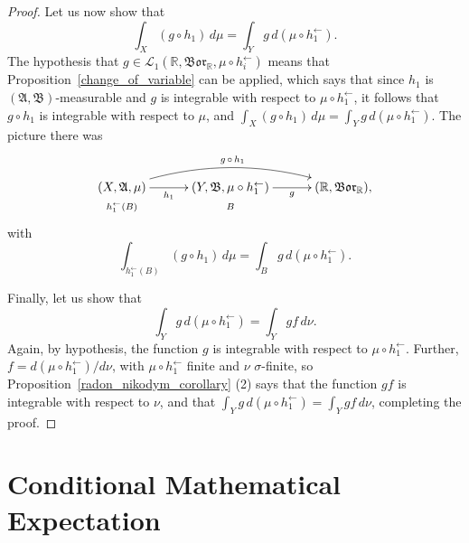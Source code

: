 \documentclass[
twoside=true,
paper=letter,
fontsize=11pt,
pagesize=auto,
leqno,
openany,
headsepline,
overfullrule,
]{scrbook}
\theoremstyle{plain}
\theoremstyle{plain}
\theoremstyle{definition}
\theoremstyle{bfnoteitalic}
\theoremstyle{bfnoteroman}
\newcommand{\sigalg}[1]{\mathfrak{#1}}
\newcommand{\cali}[1]{\mathscr{#1}}
\newcommand{\borel}{\mathfrak{Bor}}
\newcommand{\textsigma}{\hbox{\large{$\sigma$}}\kern-1pt}
\newcommand{\preimage}[1]{#1^{\leftarrow}}
\newcommand{\R}{\mathbb{R}}
\newcommand{\sigmaalgebra}{\sigalg{A}}
\newcommand{\sigmaalgebraii}{\sigalg{B}}
\newcommand{\funcf}{f}
\newcommand{\funcg}{g}
\newcommand{\funch}{h}
\newcommand{\functionii}{g}
\newcommand{\functioniii}{h}
\newcommand{\measurespace}{X}
\newcommand{\measurespaceii}{Y}
\newcommand{\measure}{\mu}
\newcommand{\measmu}{\mu}
\newcommand{\measnu}{\nu}
\newcommand{\setii}{B}
\begin{document}
\begin{proof}
Let us now show that
\[
\int_\measurespace (\funcg \circ \funch_1) \,d\measure
=
\int_\measurespaceii \funcg \, d(\measmu\circ \preimage{\funch_1}) .
\]
The hypothesis that
$\functionii \in\cali{L}_1(\R, \borel_\R,\measure\circ\preimage{\functioniii_i})$
means that Proposition~\ref{change_of_variable}  can be applied, which says that since 
$\funch_1$ is 
$(\sigmaalgebra,\sigmaalgebraii)$\hyp{}measurable and
$\funcg$ is integrable with respect to 
$\measmu \circ \preimage{\funch_1}$, it follows that 
$\funcg \circ \funch_1$ 
is integrable with respect to $\measmu$, and
$\int_\measurespace (\funcg\circ\funch_1)\,d\mu
=
\int_\measurespaceii \funcg \, d(\measmu\circ \preimage{\funch_1})$. The picture there was
\[
\xymatrix@R=0pt@C=30pt{ 
(\measurespace,\sigmaalgebra,\measure)
\ar[r]_-{\funch_1} \ar@/^16pt/[rr]^{\funcg\, \circ\, \funch_1}
& (\measurespaceii,\sigmaalgebraii,\measmu\circ \preimage{\funch_1}) 
\ar[r]_-{\funcg}
& (\R,\borel_\R), \\
\scriptstyle{\preimage{\funch_1}(\setii)} & \scriptstyle{\setii} & \\
}
\]
with
\[
\int_{\preimage{\funch_1}(\setii)} (\funcg \circ \funch_1) \, d\measure
= \int_\setii \funcg \, d(\measmu\circ \preimage{\funch_1}).
\]

Finally, let us show that 
\[
\int_\measurespaceii \funcg \, d(\measmu\circ \preimage{\funch_1})
=
\int_\measurespaceii \funcg \funcf \, d\measnu.
\]
Again, by hypothesis, the function $\funcg$ is integrable with respect to 
$\measmu\circ \preimage{\funch_1}$. Further, 
$\funcf = d(\measmu\circ\preimage{\funch_1})/d\measnu$, with 
$\measmu\circ\preimage{\funch_1}$ finite and $\measnu$ \textsigma-finite, so
Proposition~\ref{radon_nikodym_corollary} (2) says that the function
$\funcg\funcf$
is integrable with respect to $\measnu$, and that
$\int_\measurespaceii \funcg \, d(\measmu\circ \preimage{\funch_1})
=
\int_\measurespaceii \funcg \funcf \, d\measnu$,
completing the proof.
\end{proof}






\chapter{Conditional Mathematical Expectation}
\end{document}
